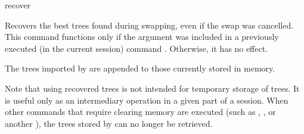 \begin{command}{recover}{}
    \syntax{\obligatory{()}}

    \begin{poydescription}
            Recovers the best trees found during swapping, even if the swap was
            cancelled. This command functions only if the argument  
            was included in a previously executed 
            (in the current \poy session) command . Otherwise, it has no effect.
	
	The trees imported by  are appended to those currently
	stored in memory.
	
	Note that using recovered trees is not intended for temporary storage of trees.
	It is useful only as an intermediary operation in a given part of a \poy session. When
	other commands that require clearing memory are executed (such as
	, , or another
	),
	the trees stored by  can no longer be retrieved.
            
    \end{poydescription}

    \begin{poyexamples}
    \end{poyexamples}

    \begin{poyalso}
    \end{poyalso}
\end{command}

